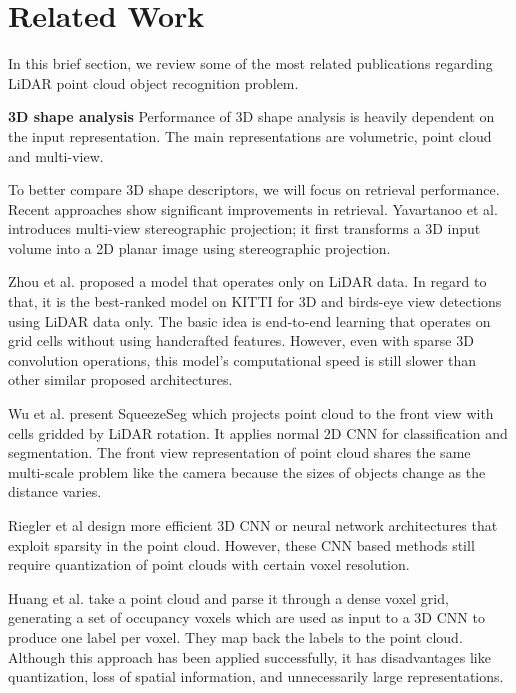 \section{Related Work}\label{sec:relatedWork}
In this brief section, we review some of the most related publications regarding LiDAR point cloud object recognition problem.

\textbf{3D shape analysis} Performance of 3D shape analysis is heavily dependent on the input representation.
The main representations are volumetric, point cloud and multi-view.

To better compare 3D shape descriptors, we will focus on retrieval performance. Recent
approaches show significant improvements in retrieval. Yavartanoo et al. \cite{DBLP:journals/corr/abs-1811-01571}
introduces multi-view stereographic projection; it first transforms a 3D input volume into a 2D planar image using stereographic projection.

Zhou et al. \cite{Zhou_2018_CVPR} proposed a model that operates only on LiDAR data.
In regard to that, it is the best-ranked model on KITTI \cite{geiger2012we} for 3D and birds-eye view detections using LiDAR data only.
The basic idea is end-to-end learning that operates on grid cells without using handcrafted features. However, even with sparse 3D convolution
operations, this model's computational speed is still slower than other similar proposed architectures.


Wu et al. \cite{DBLP:conf/icra/WuWYK18} present SqueezeSeg which projects point cloud to the front view with cells gridded by LiDAR rotation.
It applies normal 2D CNN for classification and segmentation. The front view representation of point cloud shares
the same multi-scale problem like the camera because the sizes of objects change as the distance varies.

Riegler et al \cite{DBLP:conf/cvpr/RieglerUG17} design more efficient 3D CNN or neural network architectures that exploit sparsity in the point cloud.
However, these CNN based methods still require quantization of point clouds with certain voxel resolution.

Huang et al. \cite{DBLP:conf/icpr/HuangY16} take a point cloud and parse it through a dense voxel grid, generating a set of occupancy voxels which are used as input to a 3D CNN to produce one label per voxel. They map back the labels to the point cloud. Although this approach has been applied successfully, it has disadvantages like quantization, loss of spatial information, and unnecessarily large representations.

